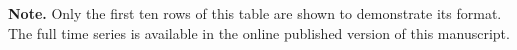 \begin{landscape}
\begin{table}
\begin{tabular}{ccccccccccccc}
\hline
\end{tabular}
\begin{list}{}{}
\item {\bf{Note.}}
  Only the first ten rows of this table are shown to demonstrate its format. The full time series is available in
  the online published version of this manuscript.
\end{list}
\end{table}
\clearpage
\end{landscape}
